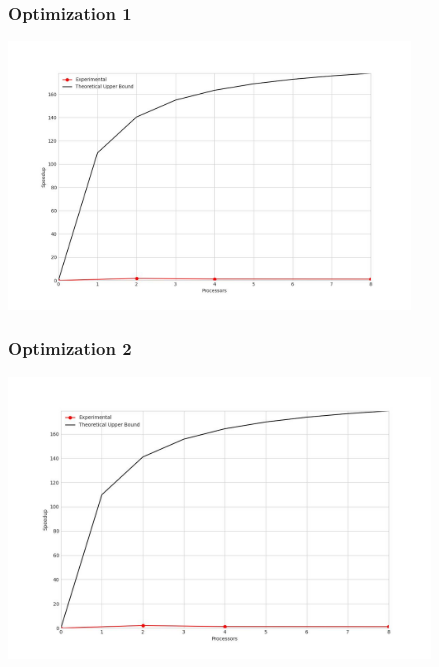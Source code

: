 \subsubsection{Optimization 1}
\begin{center}
    \resizebox{0.95\textwidth}{!}{}
    \includegraphics[width=0.8\textwidth]{../img/speedup-graph_type-tile-52000-O1}
\end{center}

\clearpage
\subsubsection{Optimization 2}
\begin{center}
    \resizebox{0.95\textwidth}{!}{}
    \includegraphics[width=0.84\textwidth]{../img/speedup-graph_type-tile-52000-O2}
\end{center}

